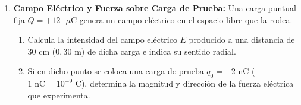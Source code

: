 \documentclass[11pt, letterpaper]{article}
\newif\ifshowanswers
\newcommand{\answer}[1]{ 
	\ifshowanswers 
	\par\vspace{0.15cm} 
	\begin{tcolorbox}[colback=blue!5!white, colframe=blue!60!white, arc=1mm, boxrule=0.5pt, title=\textbf{\footnotesize SOLUCIÓN PASO A PASO (DOCENTE)}] 
		\color{blue!80!black}\footnotesize #1 
	\end{tcolorbox} 
	\par\vspace{0.15cm} 
	\else 
	\par\vspace{0.3cm} 
	\fi 
}
\begin{document}
\begin{enumerate}[leftmargin=*, itemsep=0.8cm]
		\item \textbf{ Campo Eléctrico y Fuerza sobre Carga de Prueba:} 
		Una carga puntual fija $Q = +12\text{ }\mu\text{C}$ genera un campo eléctrico en el espacio libre que la rodea. 
		\begin{enumerate}[label=\alph*), itemsep=0.2cm] 
			\item Calcula la intensidad del campo eléctrico $E$ producido a una distancia de $30\text{ cm}$ ($0,30\text{ m}$) de dicha carga e indica su sentido radial. 
			\item Si en dicho punto se coloca una carga de prueba $q_0 = -2\text{ nC}$ ($1\text{ nC} = 10^{-9}\text{ C}$), determina la magnitud y dirección de la fuerza eléctrica que experimenta. 
		\end{enumerate} 
		\answer{ 
			\textbf{a) Campo eléctrico $E$:} 
			\[ E = k \frac{|Q|}{r^2} = (9 \times 10^9\text{ N}\cdot\text{m}^2/\text{C}^2) \cdot \frac{12 \times 10^{-6}\text{ C}}{(0,30\text{ m})^2} = \frac{1,08 \times 10^5}{0,09} = \mathbf{1,2 \times 10^6\text{ N/C}} \] 
			Sentido: Radialmente \textbf{hacia afuera} (al ser $Q$ positiva).\\[0.1cm] 
			\textbf{b) Fuerza sobre la carga de prueba $q_0$:} 
			\[ F = |q_0| \cdot E = (2 \times 10^{-9}\text{ C}) \cdot (1,2 \times 10^6\text{ N/C}) = \mathbf{2,4 \times 10^{-3}\text{ N}} = \mathbf{2,4\text{ mN}} \] 
			Dirección: Radialmente \textbf{hacia adentro} (atracción hacia la carga $+Q$, opuesta al sentido del campo $E$ porque $q_0$ es negativa). 
		} 
		

\end{enumerate}
\end{document}
